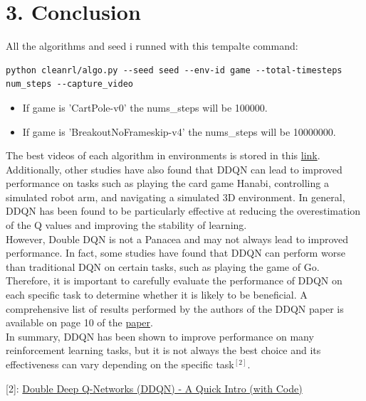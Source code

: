 \documentclass[english, a4paper,12pt]{article}
\begin{document}
\section*{3. Conclusion}
\hspace*{5mm} All the algorithms and seed i runned with this tempalte command:
\begin{verbatim}
python cleanrl/algo.py --seed seed --env-id game --total-timesteps num_steps --capture_video
\end{verbatim}
\vspace*{-10mm}
\begin{itemize}
    \item If game is 'CartPole-v0' the nums\_steps will be 100000.
    \item If game is 'BreakoutNoFrameskip-v4' the nums\_steps will be 10000000.
\end{itemize}   
\hspace*{5mm} The best videos of each algorithm in  environments is stored in this \href{https://drive.google.com/drive/u/1/folders/1Vw7R7SNeh44s3hq5KQ8unOkwG5vIrs0W}{link}.
\\
\hspace*{5mm} Additionally, other studies have also found that DDQN can lead to improved performance on tasks such as playing the card game Hanabi, controlling a simulated robot arm, and navigating a simulated 3D environment. In general, DDQN has been found to be particularly effective at reducing the overestimation of the Q values and improving the stability of learning.
\\
\hspace*{5mm}However, Double DQN is not a Panacea and may not always lead to improved performance. In fact, some studies have found that DDQN can perform worse than traditional DQN on certain tasks, such as playing the game of Go. Therefore, it is important to carefully evaluate the performance of DDQN on each specific task to determine whether it is likely to be beneficial. A comprehensive list of results performed by the authors of the DDQN paper is available on page 10 of the \href{https://arxiv.org/pdf/1509.06461}{paper}.
\\
\hspace*{5mm}In summary, DDQN has been shown to improve performance on many reinforcement learning tasks, but it is not always the best choice and its effectiveness can vary depending on the specific task$^{[2]}$.
\begin{flushright}
\scriptsize [2]: \href{https://dilithjay.com/blog/ddqn}{Double Deep Q-Networks (DDQN) - A Quick Intro (with Code)}
\end{flushright}
\end{document}
